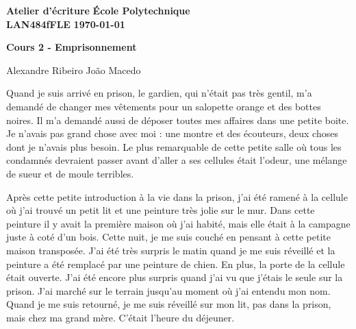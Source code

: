 \documentclass[10pt]{article} %
\newcommand{\createHeader}[5]{
	\noindent
	\normalsize\textbf{#2} \hfill \textbf{#1}\\
	\normalsize\textbf{#3} \hfill \textbf{\today}\vspace{20pt}
	\centerline{\Large \textbf{#5}}\vspace{1pt}
	\centerline{\small #4}\vspace{20pt}}
\begin{document}
	\createHeader{École Polytechnique}{Atelier d'écriture}{LAN484fFLE}{Alexandre Ribeiro João Macedo}{Cours 2 - Emprisonnement}
	
Quand je suis arrivé en prison, le gardien, qui n'était pas très gentil, m'a demandé de changer mes vêtements pour un salopette orange et des bottes noires. Il m'a demandé aussi de déposer toutes mes affaires dans une petite boite. Je n'avais pas grand chose avec moi : une montre et des écouteurs, deux choses dont je n’avais plus besoin. Le plus remarquable de cette petite salle où tous les condamnés devraient passer avant d'aller a ses cellules était l'odeur, une mélange de sueur et de moule terribles.

Après cette petite introduction à la vie dans la prison, j'ai été ramené à la cellule où j'ai trouvé un petit lit et une peinture très jolie sur le mur. Dans cette peinture il y avait la première maison où j'ai habité, mais elle était à la campagne juste à coté d’un bois. Cette nuit, je me suis couché en pensant à cette petite maison transposée. J'ai été très surpris le matin quand je me suis réveillé et la peinture a été remplacé par une peinture de chien. En plus, la porte de la cellule était ouverte. J'ai été encore plus surpris quand j'ai vu que j'étais le seule sur la prison. J'ai marché sur le terrain jusqu'au moment où j'ai entendu mon nom. Quand je me suis retourné, je me suis réveillé sur mon lit, pas dans la prison, mais chez ma grand mère. C'était l'heure du déjeuner.   
\end{document}
